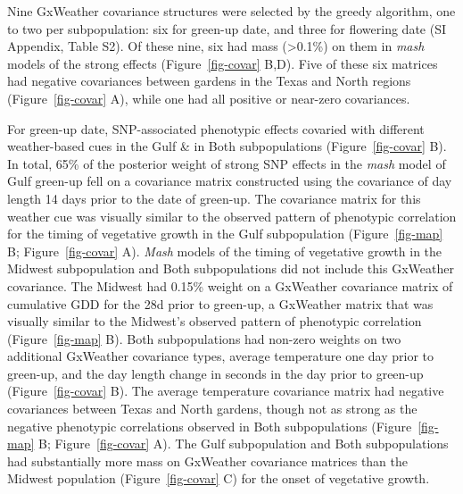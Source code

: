 \documentclass[
  9pt,
  twocolumn,
  twoside]{pnas-new}
\begin{document}
Nine GxWeather covariance structures were selected by the greedy
algorithm, one to two per subpopulation: six for green-up date, and
three for flowering date (SI Appendix, Table S2). Of these nine, six had
mass (\textgreater0.1\%) on them in \emph{mash} models of the strong
effects (Figure~\ref{fig-covar} B,D). Five of these six matrices had
negative covariances between gardens in the Texas and North regions
(Figure~\ref{fig-covar} A), while one had all positive or near-zero
covariances.

For green-up date, SNP-associated phenotypic effects covaried with
different weather-based cues in the Gulf \& in Both subpopulations
(Figure~\ref{fig-covar} B). In total, 65\% of the posterior weight of
strong SNP effects in the \emph{mash} model of Gulf green-up fell on a
covariance matrix constructed using the covariance of day length 14 days
prior to the date of green-up. The covariance matrix for this weather
cue was visually similar to the observed pattern of phenotypic
correlation for the timing of vegetative growth in the Gulf
subpopulation (Figure~\ref{fig-map} B; Figure~\ref{fig-covar} A).
\emph{Mash} models of the timing of vegetative growth in the Midwest
subpopulation and Both subpopulations did not include this GxWeather
covariance. The Midwest had 0.15\% weight on a GxWeather covariance
matrix of cumulative GDD for the 28d prior to green-up, a GxWeather
matrix that was visually similar to the Midwest's observed pattern of
phenotypic correlation (Figure~\ref{fig-map} B). Both subpopulations had
non-zero weights on two additional GxWeather covariance types, average
temperature one day prior to green-up, and the day length change in
seconds in the day prior to green-up (Figure~\ref{fig-covar} B). The
average temperature covariance matrix had negative covariances between
Texas and North gardens, though not as strong as the negative phenotypic
correlations observed in Both subpopulations (Figure~\ref{fig-map} B;
Figure~\ref{fig-covar} A). The Gulf subpopulation and Both
subpopulations had substantially more mass on GxWeather covariance
matrices than the Midwest population (Figure~\ref{fig-covar} C) for the
onset of vegetative growth.
\end{document}

